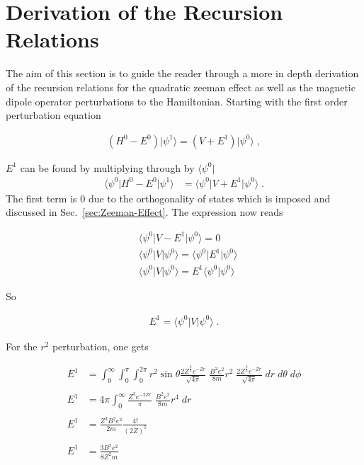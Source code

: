 \chapter{Derivation of the Recursion Relations}
    The aim of this section is to guide the reader through a more in depth derivation of the recursion relations for the quadratic zeeman effect as well as the magnetic dipole operator perturbations to the Hamiltonian. Starting with the first order perturbation equation

    \begin{align}
        \left(H^0 - E^0 \right) \vert \psi^1 \rangle = \left( V + E^1  \right) \vert \psi^0 \rangle\;,
    \end{align}

    \noindent $E^1$ can be found by multiplying through by $\langle \psi^0 \vert$
    \begin{align}
        \langle \psi^0 \vert H^0 - E^0 \vert \psi^1 \rangle &= \langle \psi^0 \vert V + E^1 \vert \psi^0 \rangle \;.
    \end{align}
    \noindent The first term is $0$ due to the orthogonality of states which is imposed and discussed in Sec.~\ref{sec:Zeeman-Effect}. The expression now reads 

    \begin{align}
        &\langle \psi^0 \vert V - E^1 \vert \psi^0 \rangle = 0 \\
        &\langle \psi^0 \vert V \vert \psi^0 \rangle =  \langle \psi^0 \vert E^1 \vert \psi^0 \rangle\\
        &\langle \psi^0 \vert V \vert \psi^0 \rangle =  E^1 \langle \psi^0 \vert \psi^0 \rangle
    \end{align}

    \noindent So 

    \begin{align}
        E^1 = \langle \psi^0 \vert V \vert \psi^0 \rangle\;.
    \end{align}

    \noindent For the $r^2$ perturbation, one gets 

    \begin{align}
        E^1 &= \int^\infty_0\int_0^\pi  \int_0^{2\pi} r^2 \sin\theta \frac{2Z^{\frac{3}{2}} e^{-Zr}}{\sqrt{4\pi}} \; \frac{B^2e^2}{8m}r^2\;  \frac{2Z^{\frac{3}{2}} e^{-Zr}}{\sqrt{4\pi}} \;dr\; d\theta\; d\phi\\ \nonumber\\
        E^1 &= {4\pi} \int_0^\infty \frac{Z^3 e^{-2Zr}}{\pi} \; \frac{B^2e^2}{8m}r^4 \;dr\\ \nonumber\\
        E^1 &= \frac{Z^3 B^2 e^2}{2m} \frac{4!}{(2Z)^5} \\ \nonumber \\
        E^1 &= \frac{3 B^2 e^2}{8Z^2m}
    \end{align}

